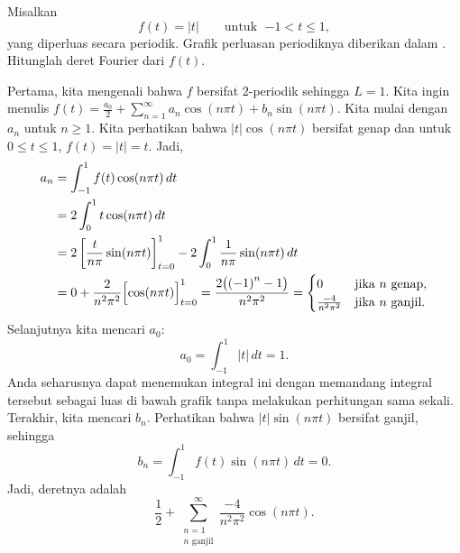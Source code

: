 \begin{example}
Misalkan
\begin{equation*}
f(t) =
\lvert t \rvert
\qquad \text{untuk } \; {-1} < t \leq 1,
\end{equation*}
yang diperluas secara periodik.  Grafik
perluasan periodiknya diberikan dalam .
Hitunglah deret Fourier dari $f(t)$.

\begin{myfig}
\capstart
{}
\caption{Perluasan periodik fungsi $f(t)$.\label{gfs:sawcontfig}}
\end{myfig}

Pertama, kita mengenali bahwa $f$ bersifat $2$-periodik sehingga $L=1$.
Kita ingin
menulis $f(t) = \frac{a_0}{2} + \sum_{n=1}^\infty a_n \cos (n \pi t) + b_n
\sin (n \pi t)$.  Kita mulai dengan $a_n$ untuk $n \geq 1$.
Kita perhatikan bahwa $\lvert t \rvert \cos (n \pi t)$
bersifat genap dan untuk $0 \leq t \leq 1$, $f(t) = \lvert t \rvert = t$.  Jadi,
\begin{equation*}
\begin{split}
a_n & = \int_{-1}^1 f(t) \cos (n \pi t) \, dt \\
& = 2 \int_{0}^1 t \cos (n \pi t) \, dt \\
 & = 2 \left[ \frac{t}{n \pi} \sin (n \pi t) \right]_{t=0}^1 -
2 \int_{0}^1 \frac{1}{n \pi} \sin (n \pi t) \, dt \\
& =  0 + \frac{2}{n^2 \pi^2} \Bigl[ \cos (n \pi t) \Bigr]_{t=0}^1
 =  \frac{2 \bigl( {(-1)}^n -1 \bigr) }{n^2 \pi^2}
=
\begin{cases}
0 & \text{jika } n \text{ genap} , \\
\frac{-4 }{n^2 \pi^2} & \text{jika } n \text{ ganjil}  .
\end{cases}
\end{split}
\end{equation*}
Selanjutnya kita mencari $a_0$:
\begin{equation*}
a_0 = \int_{-1}^1 \lvert t \rvert \, dt 
=
1 .
\end{equation*}
Anda seharusnya dapat menemukan integral ini dengan memandang integral tersebut
sebagai luas di bawah grafik tanpa melakukan perhitungan sama sekali.
Terakhir, kita mencari $b_n$.  Perhatikan bahwa
$\lvert t \rvert \sin (n \pi t)$ bersifat ganjil, sehingga
\begin{equation*}
b_n = \int_{-1}^1 f(t) \sin (n \pi t) \, dt = 0 .
\end{equation*}
Jadi,
deretnya adalah
\begin{equation*}
\frac{1}{2} + 
\sum_{\substack{n=1 \\ n \text{ ganjil}}}^\infty \frac{-4}{n^2 \pi^2} \cos (n \pi t) .
\end{equation*}


\end{example}
